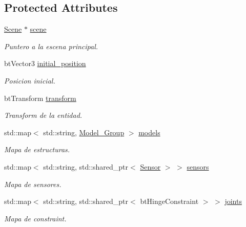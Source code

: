 \subsection*{Protected Attributes}
\begin{DoxyCompactItemize}
\item 
\mbox{\hyperlink{classexample_1_1_scene}{Scene}} $\ast$ \mbox{\hyperlink{classexample_1_1_entity_ab851dbde4a16829f9fb77ab9a66b9f1e}{scene}}
\begin{DoxyCompactList}\small\item\em Puntero a la escena principal. \end{DoxyCompactList}\item 
bt\+Vector3 \mbox{\hyperlink{classexample_1_1_entity_a2b0441f54efe4182501abf0fe40d0f16}{initial\+\_\+position}}
\begin{DoxyCompactList}\small\item\em Posicion inicial. \end{DoxyCompactList}\item 
bt\+Transform \mbox{\hyperlink{classexample_1_1_entity_a3f63d3a2a963e89db62efb2b75b305e6}{transform}}
\begin{DoxyCompactList}\small\item\em Transform de la entidad. \end{DoxyCompactList}\item 
std\+::map$<$ std\+::string, \mbox{\hyperlink{structexample_1_1_entity_1_1_model___group}{Model\+\_\+\+Group}} $>$ \mbox{\hyperlink{classexample_1_1_entity_aee6624fdf628ff23ef1c17d092aec2e4}{models}}
\begin{DoxyCompactList}\small\item\em Mapa de estructuras. \end{DoxyCompactList}\item 
std\+::map$<$ std\+::string, std\+::shared\+\_\+ptr$<$ \mbox{\hyperlink{classexample_1_1_sensor}{Sensor}} $>$ $>$ \mbox{\hyperlink{classexample_1_1_entity_a70006fe7e6c77160ae6ce0ac3ed25e65}{sensors}}
\begin{DoxyCompactList}\small\item\em Mapa de sensores. \end{DoxyCompactList}\item 
std\+::map$<$ std\+::string, std\+::shared\+\_\+ptr$<$ bt\+Hinge\+Constraint $>$ $>$ \mbox{\hyperlink{classexample_1_1_entity_ad553e808e658d2884ede11c5a328865d}{joints}}
\begin{DoxyCompactList}\small\item\em Mapa de constraint. \end{DoxyCompactList}\end{DoxyCompactItemize}


